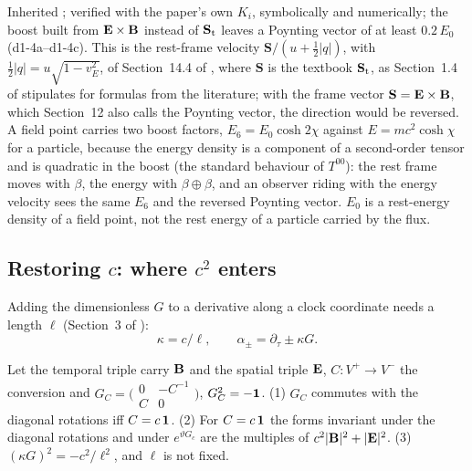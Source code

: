 Inherited \cite{LandauLifshitz2}; verified with the paper's own $K_i$, symbolically and numerically; the boost built from $\mathbf E\times\mathbf B$ instead
of $\mathbf S_{\rm t}$ leaves a Poynting vector of at least $0.2\,E_0$ (d1-4a--d1-4c). This is the rest-frame velocity $\mathbf S/(u+\tfrac12|q|)$, with $\tfrac12|q|=u\sqrt{1-v_E^2}$, of Section~14.4 of
\cite{ES17}, where $\mathbf S$ is the textbook $\mathbf S_{\rm t}$, as Section~1.4 of \cite{ES17} stipulates for formulas from the literature; with the
frame vector $\mathbf S=\mathbf E\times\mathbf B$, which Section~12 also calls the Poynting vector, the direction would be reversed. A field point carries two boost
factors, $E_6=E_0\cosh2\chi$ against $E=mc^2\cosh\chi$ for a particle, because the energy density is a component of a second-order tensor and is
quadratic in the boost (the standard behaviour of $T^{00}$): the rest frame moves with $\beta$, the energy with $\beta\oplus\beta$, and an observer
riding with the energy velocity sees the same $E_6$ and the reversed Poynting vector. $E_0$ is a rest-energy density of a field point, not the rest
energy of a particle carried by the flux.

\subsection{\texorpdfstring{Restoring $c$: where $c^2$ enters}{Restoring c: where c squared enters}}
\label{d1:sec:c}

Adding the dimensionless $G$ to a derivative along a clock coordinate needs a length $\ell$ (Section~3 of \cite{ES17}):
\begin{equation}
\label{d1:eq:kappa}
\kappa=c/\ell,\qquad \alpha_\pm=\partial_\tau\pm\kappa G .
\end{equation}

\begin{proposition}
\label{d1:prop:onec}
Let the temporal triple carry $\mathbf B$ and the spatial triple $\mathbf E$, $C:V^+\to V^-$ the conversion and
$G_C=\bigl(\begin{smallmatrix}0&-C^{-1}\\ C&0\end{smallmatrix}\bigr)$, $G_C^2=-\mathbf 1$. (1) $G_C$ commutes with the diagonal rotations iff $C=c\,\mathbf 1$.
(2) For $C=c\,\mathbf 1$ the forms invariant under the diagonal rotations and under $e^{\vartheta G_c}$ are the multiples of $c^2|\mathbf B|^2+|\mathbf E|^2$.
(3) $(\kappa G)^2=-c^2/\ell^2$, and $\ell$ is not fixed.
\end{proposition}

